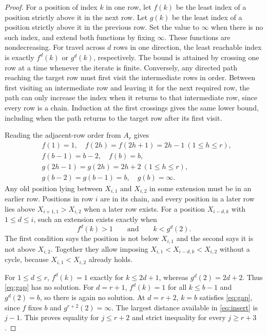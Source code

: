 \documentclass[11pt]{amsart}
\begin{document}
\begin{proof}
For a position of index $k$ in one row, let $f(k)$ be the least index of a position strictly above it in the next row. Let $g(k)$ be the least index of a position strictly above it in the previous row. Set the value to $\infty$ when there is no such index, and extend both functions by fixing $\infty$. These functions are nondecreasing. For travel across $d$ rows in one direction, the least reachable index is exactly $f^d(k)$ or $g^d(k)$, respectively. The bound is attained by crossing one row at a time whenever the iterate is finite. Conversely, any directed path reaching the target row must first visit the intermediate rows in order. Between first visiting an intermediate row and leaving it for the next required row, the path can only increase the index when it returns to that intermediate row, since every row is a chain. Induction at the first crossings gives the same lower bound, including when the path returns to the target row after its first visit.

Reading the adjacent-row order from $A_r$ gives
\[
\begin{aligned}
 &f(1)=1,\quad f(2h)=f(2h+1)=2h-1\ (1\le h\le r),\\
 &f(b-1)=b-2,\quad f(b)=b,\\[2pt]
 &g(2h-1)=g(2h)=2h+2\ (1\le h\le r),\\
 &g(b-2)=g(b-1)=b,\quad g(b)=\infty.
\end{aligned}
\]
Any old position lying between $X_{i,1}$ and $X_{i,2}$ in some extension must be in an earlier row. Positions in row $i$ are in its chain, and every position in a later row lies above $X_{i+1,1}>X_{i,2}$ when a later row exists. For a position $X_{i-d,k}$ with $1\le d\le i$, such an extension exists exactly when
\begin{equation}\label{eq:gap}
 f^d(k)>1\qquad\text{and}\qquad k<g^d(2).
\end{equation}
The first condition says the position is not below $X_{i,1}$ and the second says it is not above $X_{i,2}$. Together they allow imposing $X_{i,1}<X_{i-d,k}<X_{i,2}$ without a cycle, because $X_{i,1}<X_{i,2}$ already holds.

For $1\le d\le r$, $f^d(k)=1$ exactly for $k\le 2d+1$, whereas $g^d(2)=2d+2$. Thus \eqref{eq:gap} has no solution. For $d=r+1$, $f^d(k)=1$ for all $k\le b-1$ and $g^d(2)=b$, so there is again no solution. At $d=r+2$, $k=b$ satisfies \eqref{eq:gap}, since $f$ fixes $b$ and $g^{r+2}(2)=\infty$. The largest distance available in \eqref{eq:insert} is $j-1$. This proves equality for $j\le r+2$ and strict inequality for every $j\ge r+3$.
\end{proof}
\end{document}
